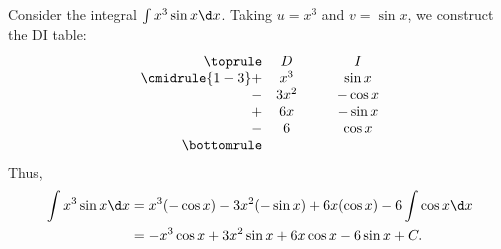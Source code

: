 \begin{example}[DI Method]
    Consider the integral $\int x^3 \sin x \d x$. Taking $u = x^3$ and $v = \sin x$, we construct the DI table:
    \[
    \begin{array}{r c @{\hspace*{1.0cm}} c}\toprule
        & D & I \\\cmidrule{1-3}
        + & x^3 & \sin x \\
        - & 3x^2 & -\cos x \\
        + & 6x & -\sin x\\
        - & 6 & \cos x\\\bottomrule
    \end{array}
    \]
    Thus,
    \begin{align*}
        \int x^3 \sin x \d x &= x^3 (-\cos x) - 3x^2(-\sin x) + 6x(\cos x) - 6\int \cos x \d x\\
        &= -x^3 \cos x + 3x^2 \sin x + 6x\cos x - 6\sin x + C.
    \end{align*}
\end{example}